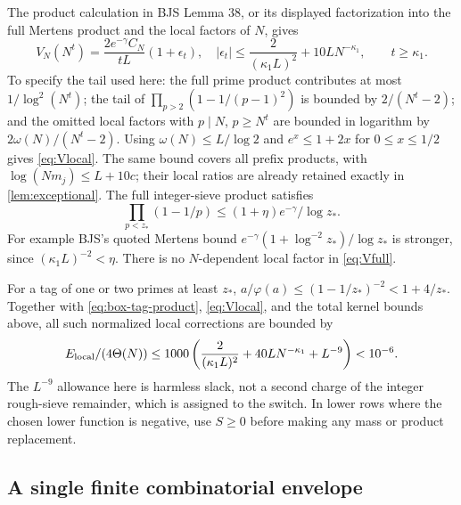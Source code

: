 \documentclass[11pt]{article}
\theoremstyle{definition}
\newcommand{\Th}{\Theta(N)}
\begin{document}
The product calculation in BJS Lemma 38, or its displayed factorization
into the full Mertens product and the local factors of $N$, gives
\begin{equation}\label{eq:Vlocal}
 V_N(N^t)=\frac{2e^{-\gamma}C_N}{tL}(1+\epsilon_t),
 \quad |\epsilon_t|\le
 \frac{2}{(\kappa_1L)^2}+10L N^{-\kappa_1},
 \qquad t\ge\kappa_1.
\end{equation}
To specify the tail used here: the full prime product contributes at
most $1/\log^2(N^t)$; the tail of
$\prod_{p>2}(1-1/(p-1)^2)$ is bounded by
$2/(N^t-2)$; and the omitted local factors with $p\mid N$, $p\ge N^t$
are bounded in logarithm by $2\omega(N)/(N^t-2)$.
Using $\omega(N)\le L/\log2$ and $e^x\le1+2x$ for $0\le x\le1/2$
gives \eqref{eq:Vlocal}.  The same bound covers all prefix products,
with $\log(Nm_j)\le L+10c$; their local ratios are already retained
exactly in \cref{lem:exceptional}.
The full integer-sieve product satisfies
\begin{equation}\label{eq:Vfull}
 \prod_{p<z_*}(1-1/p)\le
 (1+\eta)e^{-\gamma}/\log z_*.
\end{equation}
For example BJS's quoted Mertens bound
$e^{-\gamma}(1+\log^{-2}z_*)/\log z_*$
is stronger, since $(\kappa_1L)^{-2}<\eta$.
There is no $N$-dependent local factor in \eqref{eq:Vfull}.

For a tag of one or two primes at least $z_*$,
$a/\varphi(a)\le(1-1/z_*)^{-2}<1+4/z_*$.
Together with \eqref{eq:box-tag-product}, \eqref{eq:Vlocal}, and the
total kernel bounds above, all such normalized local corrections are
bounded by
\begin{equation}\label{eq:local-cost}
 E_{\rm local}/(4\Th)
 \le1000\left(\frac{2}{(\kappa_1L)^2}
                  +40L N^{-\kappa_1}+L^{-9}\right)<10^{-6}.
\end{equation}
The $L^{-9}$ allowance here is harmless slack, not a second charge of
the integer rough-sieve remainder, which is assigned to the switch.
In lower rows where the chosen lower function is negative, use $S\ge0$
before making any mass or product replacement.

\subsection{A single finite combinatorial envelope}
\end{document}
